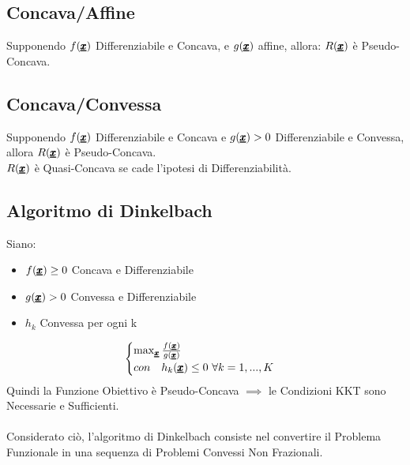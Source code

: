 \subsection{Concava/Affine}
Supponendo $f(\pmb{\underline{x}})$ Differenziabile e Concava, e $g(\pmb{\underline{x}})$ affine, allora: $R(\pmb{\underline{x}})$ è Pseudo-Concava.

\subsection{Concava/Convessa}
Supponendo $f(\pmb{\underline{x}})$ Differenziabile e Concava e $g(\pmb{\underline{x}}) > 0$ Differenziabile e Convessa, allora $R(\pmb{\underline{x}})$ è Pseudo-Concava.\\ 
$R(\pmb{\underline{x}})$ è Quasi-Concava se cade l'ipotesi di Differenziabilità.

\subsection{Algoritmo di Dinkelbach}
Siano:
\begin{itemize}
    \item $f(\pmb{\underline{x}}) \geq 0$ Concava e Differenziabile
    \item $g(\pmb{\underline{x}}) > 0$ Convessa e Differenziabile
    \item $h_k$ Convessa per ogni k
\end{itemize}
\begin{equation*}
    \begin{cases}
    \max_{\pmb{\underline{x}}} \frac{f(\pmb{\underline{x}})}{g(\pmb{\underline{x}})} \\
    con \quad h_k(\pmb{\underline{x}}) \leq 0 \ \forall k=1,...,K
    \end{cases}
\end{equation*}
Quindi la Funzione Obiettivo è Pseudo-Concava $\implies$ le Condizioni KKT sono Necessarie e Sufficienti.\\ \\
Considerato ciò, l'algoritmo di Dinkelbach consiste nel convertire il Problema Funzionale in una sequenza di Problemi Convessi Non Frazionali.\\ 
